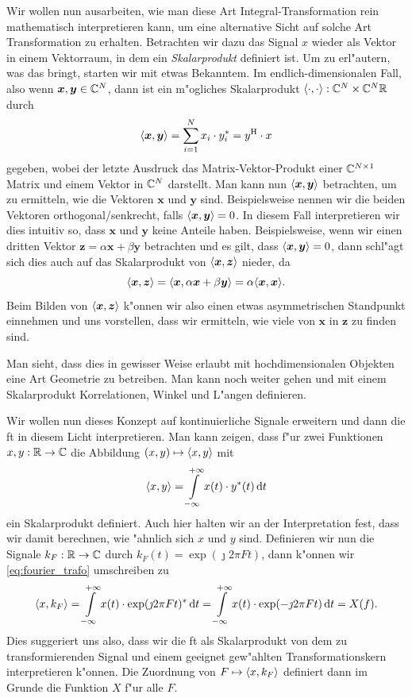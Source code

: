 Wir wollen nun ausarbeiten, wie man diese Art Integral-Transformation rein mathematisch interpretieren kann, um eine alternative Sicht auf solche Art Transformation zu erhalten.
Betrachten wir dazu das Signal $x$ wieder als Vektor in einem Vektorraum, in dem ein \emph{Skalarprodukt} definiert ist.
Um zu erl"autern, was das bringt, starten wir mit etwas Bekanntem.
Im endlich-dimensionalen Fall, also wenn $\bm x, \bm y \in \mathbb{C}^N$, dann ist ein m"ogliches Skalarprodukt ${\left\langle \cdot,\cdot \right\rangle} : \mathbb{C}^N \times \mathbb{C}^N \mathbb{R}$ durch
\[
 {\left\langle \bm x,\bm y \right\rangle} 
    = {\sum\limits_{i = 1}^{N}{x_i \cdot y^\ast_i}} 
    = y^{\mathrm{H}} \cdot x
\]
gegeben, wobei der letzte Ausdruck das Matrix-Vektor-Produkt einer $\mathbb{C}^{N \times 1}$ Matrix und einem Vektor in $\mathbb{C}^N$ darstellt.
Man kann nun ${\left\langle \bm x,\bm y \right\rangle}$ betrachten, um zu ermitteln, wie  die Vektoren $\bm x$ und $\bm y$ sind.
Beispielsweise nennen wir die beiden Vektoren orthogonal/senkrecht, falls ${\left\langle \bm x,\bm y \right\rangle} = 0$. 
In diesem Fall interpretieren wir dies intuitiv so, dass $\bm x$ und $\bm y$ keine  Anteile haben.
Beispielsweise, wenn wir einen dritten Vektor $\bm z = \alpha \bm x + \beta \bm y$ betrachten und es gilt, dass ${\left\langle \bm x,\bm y \right\rangle} = 0$, dann schl"agt sich dies auch auf das Skalarprodukt von ${\left\langle \bm x,\bm z \right\rangle}$ nieder, da
%
\[
    {\left\langle \bm x,\bm z \right\rangle} 
        = {\left\langle \bm x,\alpha \bm x + \beta \bm y \right\rangle}
        = \alpha {\left\langle \bm x,\bm x \right\rangle}.
\]
%
Beim Bilden von ${\left\langle \bm x,\bm z \right\rangle}$ k"onnen wir also einen etwas asymmetrischen Standpunkt einnehmen und uns vorstellen, dass wir ermitteln, wie viele  von $\bm x$ in $\bm z$ zu finden sind.

Man sieht, dass dies in gewisser Weise erlaubt mit hochdimensionalen Objekten eine Art Geometrie zu betreiben.
Man kann noch weiter gehen und mit einem Skalarprodukt Korrelationen, Winkel und L"angen definieren.

Wir wollen nun dieses Konzept auf kontinuierliche Signale erweitern und dann die \gls{ft} in diesem Licht interpretieren.
Man kann zeigen, dass f"ur zwei Funktionen $x,y : \mathbb{R} \rightarrow \mathbb{C}$ die Abbildung $(x,y) \mapsto {\left\langle x,y \right\rangle}$ mit
%
\begin{equation}\label{eq:cont_scpr}
    {\left\langle x,y \right\rangle} = {\int\limits_{-\infty}^{+\infty}{
        x(t) \cdot y^\ast(t)
    }\,\mathrm{d}{t}}
\end{equation}
%
ein Skalarprodukt definiert. 
Auch hier halten wir an der Interpretation fest, dass wir damit berechnen, wie "ahnlich sich $x$ und $y$ sind.
Definieren wir nun die Signale $k_F: \mathbb{R} \rightarrow \mathbb{C}$ durch $k_F(t) = \exp(\jmath 2 \pi F t)$, dann k"onnen wir \eqref{eq:fourier_trafo} umschreiben zu
\[
{\left\langle x,k_F \right\rangle} 
    = {\int\limits_{-\infty}^{+\infty}{
        x(t) \cdot \exp(\jmath 2 \pi F t)^\ast
    }\,\mathrm{d}{t}}
    = {\int\limits_{-\infty}^{+\infty}{
        x(t) \cdot \exp(-\jmath 2 \pi F t)
    }\,\mathrm{d}{t}}
    = X(f).
\]
Dies suggeriert uns also, dass wir die \gls{ft} als Skalarprodukt von dem zu transformierenden Signal und einem geeignet gew"ahlten Transformationskern interpretieren k"onnen.
Die Zuordnung von $F \mapsto {\left\langle x,k_F \right\rangle}$ definiert dann im Grunde die Funktion $X$ f"ur alle $F$.

